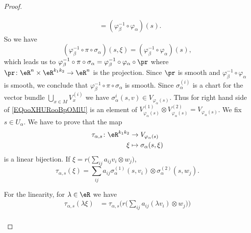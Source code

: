 \begin{proof}
\begin{subproof}
\begin{subequations}
\begin{align}
				                                                   & =(\varphi_{\beta}^{-1}\circ\varphi_{\alpha})(s).
			\end{align}
		\end{subequations}
		So we have
		\begin{equation}
			(\varphi_{\beta}^{-1}\circ\pi\circ\sigma_{\alpha})(s,\xi)=(\varphi_{\beta}^{-1}\circ\varphi_{\alpha})(s),
		\end{equation}
		which leads us to \( \varphi_{\beta}^{-1}\circ\pi\circ\sigma_{\alpha}=\varphi_{\beta}^{-1}\circ\varphi_{\alpha}\circ\pr\) where \(\pr \colon \eR^n\times \eR^{k_1k_2}\to \eR^n  \) is the projection. Since \( \pr\) is smooth and \( \varphi_{\beta}^{-1}\circ\varphi_{\alpha}\) is smooth, we conclude that \( \varphi_{\beta}^{-1}\circ\pi\circ\sigma_{\alpha}\) is smooth.
		Since \( \sigma_{\alpha}^{(i)}\) is a chart for the vector bundle \( \bigcup_{x\in M}V_x^{(i)}\) we have \( \sigma_{\alpha}^{i}(s,v)\in V_{\varphi_{\alpha}(s)}\). Thus for right hand side of \eqref{EQooXHURooBpOMlU} is an element of \( V_{\varphi_{\alpha}(s)}^{(1)}\otimes V_{\varphi_{\alpha}(s)}^{(2)}=V_{\varphi_{\alpha}(s)}\).
		We fix \( s\in U_{\alpha}\). We have to prove that the map
		\begin{equation}
			\begin{aligned}
				\tau_{\alpha,s}\colon \eR^{k_1k_2} & \to V_{\varphi_{\alpha}(s)}    \\
				\xi                                & \mapsto \sigma_{\alpha}(s,\xi)
			\end{aligned}
		\end{equation}
		is a linear bijection. If \( \xi=r\big( \sum_{ij}a_{ij}v_i\otimes w_j \big)\),
		\begin{equation}
			\tau_{\alpha,s}(\xi)=\sum_{ij}a_{ij}\sigma_{\alpha}^{(1)}(s,v_i)\otimes \sigma_{\alpha}^{(2)}(s,w_j).
		\end{equation}
		\begin{subproof}
			\spitem[Linear]
			For the linearity, for \( \lambda\in \eR\) we have
			\begin{subequations}
				\begin{align}
					\tau_{\alpha,s}(\lambda\xi) & =\tau_{\alpha,s}\Big( r\big( \sum_{ij}a_{ij}(\lambda v_i)\otimes w_j \big) \Big)         \\

\end{align}
\end{subequations}
\end{subproof}
\end{subproof}
\end{proof}
